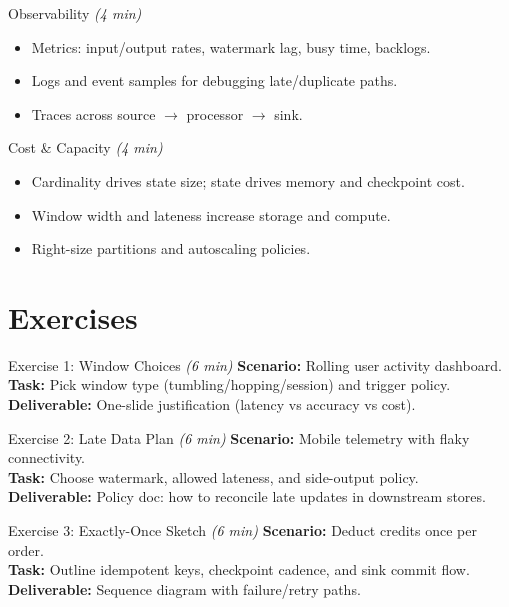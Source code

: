 \documentclass[aspectratio=169,11pt]{beamer}
\newcommand{\mins}[1]{\textit{(#1 min)}}
\begin{document}
\begin{frame}{Observability \mins{4}}
  \begin{itemize}
    \item Metrics: input/output rates, watermark lag, busy time, backlogs.
    \item Logs and event samples for debugging late/duplicate paths.
    \item Traces across source $\rightarrow$ processor $\rightarrow$ sink.
  \end{itemize}
\end{frame}

\begin{frame}{Cost \& Capacity \mins{4}}
  \begin{itemize}
    \item Cardinality drives state size; state drives memory and checkpoint cost.
    \item Window width and lateness increase storage and compute.
    \item Right-size partitions and autoscaling policies.
  \end{itemize}
\end{frame}

\section{Exercises}
\begin{frame}{Exercise 1: Window Choices \mins{6}}
  \textbf{Scenario:} Rolling user activity dashboard.\\
  \textbf{Task:} Pick window type (tumbling/hopping/session) and trigger policy.\\
  \textbf{Deliverable:} One-slide justification (latency vs accuracy vs cost).
\end{frame}

\begin{frame}{Exercise 2: Late Data Plan \mins{6}}
  \textbf{Scenario:} Mobile telemetry with flaky connectivity.\\
  \textbf{Task:} Choose watermark, allowed lateness, and side-output policy.\\
  \textbf{Deliverable:} Policy doc: how to reconcile late updates in downstream stores.
\end{frame}

\begin{frame}{Exercise 3: Exactly-Once Sketch \mins{6}}
  \textbf{Scenario:} Deduct credits once per order.\\
  \textbf{Task:} Outline idempotent keys, checkpoint cadence, and sink commit flow.\\
  \textbf{Deliverable:} Sequence diagram with failure/retry paths.
\end{frame}
\end{document}
